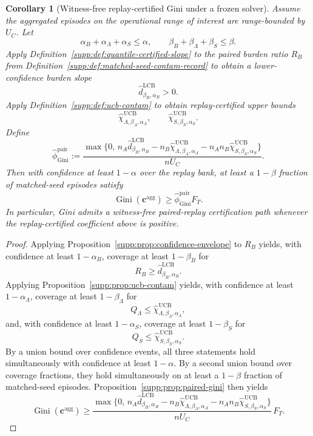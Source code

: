 \documentclass[11pt]{article}
\newcommand{\1}{\mathbf{1}}
\newcommand{\Gini}{\operatorname{Gini}}
\theoremstyle{definition}
\theoremstyle{plain}
\newtheorem{corollary}[definition]{Corollary}
\theoremstyle{remark}
\begin{document}
\begin{corollary}[Witness-free replay-certified Gini under a frozen solver]
\label{supp:cor:witness-free-gini}
Assume the aggregated episodes on the operational range of interest are range-bounded by $U_C$. Let
\[
\alpha_B+\alpha_\Lambda+\alpha_S \le \alpha,
\qquad
\beta_B+\beta_\Lambda+\beta_S \le \beta.
\]
Apply Definition~\ref{supp:def:quantile-certified-slope} to the paired burden ratio $R_B$ from Definition~\ref{supp:def:matched-seed-contam-record} to obtain a lower-confidence burden slope
\[
\widehat d^{\mathrm{LCB}}_{\beta_B,\alpha_B}>0.
\]
Apply Definition~\ref{supp:def:ucb-contam} to obtain replay-certified upper bounds
\[
\widehat\chi_{\Lambda,\beta_\Lambda,\alpha_\Lambda}^{\mathrm{UCB}},
\qquad
\widehat\chi_{S,\beta_S,\alpha_S}^{\mathrm{UCB}}.
\]
Define
\[
\widehat\phi_{\Gini}^{\mathrm{pair}}
:=
\frac{
\max\{0,\,
 n_A \widehat d^{\mathrm{LCB}}_{\beta_B,\alpha_B}
 - n_B \widehat\chi_{\Lambda,\beta_\Lambda,\alpha_\Lambda}^{\mathrm{UCB}}
 - n_A n_B \widehat\chi_{S,\beta_S,\alpha_S}^{\mathrm{UCB}}
\}
}{nU_C}.
\]
Then with confidence at least $1-\alpha$ over the replay bank, at least a $1-\beta$ fraction of matched-seed episodes satisfy
\[
\Gini(\mathbf c^{\mathrm{agg}})
\ge
\widehat\phi_{\Gini}^{\mathrm{pair}} F_T.
\]
In particular, Gini admits a witness-free paired-replay certification path whenever the replay-certified coefficient above is positive.
\end{corollary}

\begin{proof}
Applying Proposition~\ref{supp:prop:confidence-envelope} to $R_B$ yields, with confidence at least $1-\alpha_B$, coverage at least $1-\beta_B$ for
\[
R_B \ge \widehat d^{\mathrm{LCB}}_{\beta_B,\alpha_B}.
\]
Applying Proposition~\ref{supp:prop:ucb-contam} yields, with confidence at least $1-\alpha_\Lambda$, coverage at least $1-\beta_\Lambda$ for
\[
Q_\Lambda \le \widehat\chi_{\Lambda,\beta_\Lambda,\alpha_\Lambda}^{\mathrm{UCB}},
\]
and, with confidence at least $1-\alpha_S$, coverage at least $1-\beta_S$ for
\[
Q_S \le \widehat\chi_{S,\beta_S,\alpha_S}^{\mathrm{UCB}}.
\]
By a union bound over confidence events, all three statements hold simultaneously with confidence at least $1-\alpha$. By a second union bound over coverage fractions, they hold simultaneously on at least a $1-\beta$ fraction of matched-seed episodes. Proposition~\ref{supp:prop:paired-gini} then yields
\[
\Gini(\mathbf c^{\mathrm{agg}})
\ge
\frac{
\max\{0,\,
 n_A \widehat d^{\mathrm{LCB}}_{\beta_B,\alpha_B}
 - n_B \widehat\chi_{\Lambda,\beta_\Lambda,\alpha_\Lambda}^{\mathrm{UCB}}
 - n_A n_B \widehat\chi_{S,\beta_S,\alpha_S}^{\mathrm{UCB}}
\}
}{nU_C}\,F_T.
\]
\end{proof}
\end{document}
